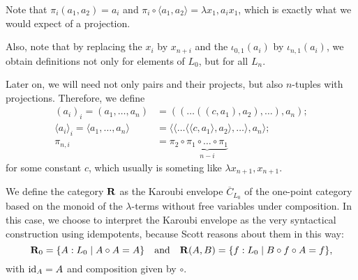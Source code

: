 Note that $ \pi_i (a_1, a_2) = a_i $ and $ \pi_i \circ \langle a_1, a_2 \rangle = \lambda x_1, a_i x_1 $, which is exactly what we would expect of a projection.

Also, note that by replacing the $ x_i $ by $ x_{n + i} $ and the $ \iota_{0, 1}(a_i) $ by $ \iota_{n, 1}(a_i) $, we obtain definitions not only for elements of $ L_0 $, but for all $ L_n $.

Later on, we will need not only pairs and their projects, but also $ n $-tuples with projections. Therefore, we define
\begin{align*}
  (a_i)_i = (a_1, \dots, a_n) &= ((\dots((c, a_1), a_2), \dots), a_n);\\
  \langle a_i \rangle_i = \langle a_1, \dots, a_n \rangle &= \langle\langle\dots\langle\langle c, a_1\rangle, a_2\rangle, \dots\rangle, a_n\rangle;\\
  \pi_{n, i} &= \pi_2 \circ \underbrace{\pi_1 \circ \dots \circ \pi_1}_{n - i}
\end{align*}
for some constant $ c $, which usually is someting like $ \lambda x_{n + 1}, x_{n + 1} $.

\begin{definition}
  We define the category $ \mathbf{R} $ as the Karoubi envelope $ \overline C_{L_0} $ of the one-point category based on the monoid of the $ \lambda $-terms without free variables under composition. In this case, we choose to interpret the Karoubi envelope as the very syntactical construction using idempotents, because Scott reasons about them in this way:
  \[ \mathbf{R}_0 = \{ A : L_0 \mid A \circ A = A \} \quad \text{and} \quad \mathbf{R}(A, B) = \{ f: L_0 \mid B \circ f \circ A = f \}, \]
  with $ \text{id}_{A} = A $ and composition given by $ \circ $.
\end{definition}

